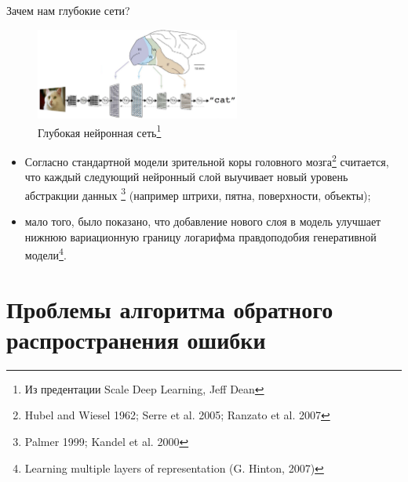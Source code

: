 \documentclass[10pt]{beamer}
\begin{document}
\begin{frame}{Зачем нам глубокие сети?}

\begin{figure}[h!]
  \centering
  \includegraphics[width=0.6\textwidth]{images/deepnet1.png}
  \caption{Глубокая нейронная сеть\footnote{Из предентации Scale Deep Learning, Jeff Dean}}
\end{figure}

\begin{itemize}
	\item Согласно стандартной модели зрительной коры головного мозга\footnote{Hubel and Wiesel 1962; Serre et al. 2005; Ranzato et al.
2007} считается, что каждый следующий нейронный слой выучивает новый уровень абстракции данных \footnote{Palmer 1999; Kandel et al. 2000} (например штрихи, пятна, поверхности, объекты);
	\item мало того, было показано, что добавление нового слоя в модель улучшает нижнюю вариационную границу логарифма правдоподобия генеративной модели\footnote{Learning multiple layers of representation (G. Hinton, 2007)}.
\end{itemize}

\end{frame}


\section{Проблемы алгоритма обратного распространения ошибки}
\end{document}
